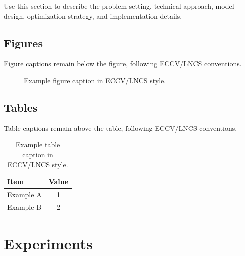 \documentclass[runningheads]{llncs}
\begin{document}
Use this section to describe the problem setting, technical approach, model design, optimization strategy, and implementation details.

\subsection{Figures}

Figure captions remain below the figure, following ECCV/LNCS conventions.

\begin{figure}[t]
    \centering
    \fbox{\rule{0pt}{1.6in}\rule{0.9\linewidth}{0pt}}
    \caption{Example figure caption in ECCV/LNCS style.}
    \label{fig:example}
\end{figure}

\subsection{Tables}

Table captions remain above the table, following ECCV/LNCS conventions.

\begin{table}[t]
    \centering
    \caption{Example table caption in ECCV/LNCS style.}
    \label{tab:example}
    \begin{tabular}{lc}
        \toprule
        Item & Value \\
        \midrule
        Example A & 1 \\
        Example B & 2 \\
        \bottomrule
    \end{tabular}
\end{table}

\section{Experiments}
\end{document}
